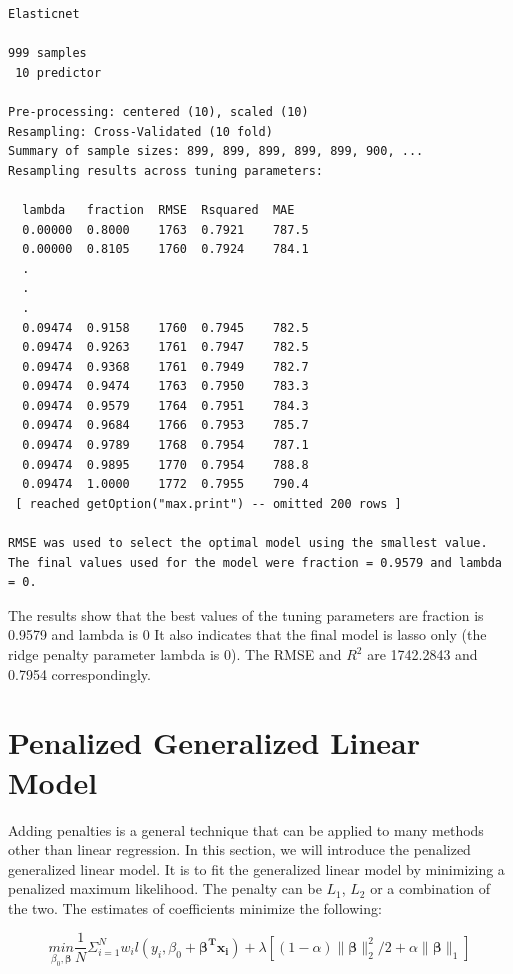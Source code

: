 \documentclass[12pt,]{krantz}
\begin{document}
\begin{verbatim}
Elasticnet 

999 samples
 10 predictor

Pre-processing: centered (10), scaled (10) 
Resampling: Cross-Validated (10 fold) 
Summary of sample sizes: 899, 899, 899, 899, 899, 900, ... 
Resampling results across tuning parameters:

  lambda   fraction  RMSE  Rsquared  MAE  
  0.00000  0.8000    1763  0.7921    787.5
  0.00000  0.8105    1760  0.7924    784.1
  .
  .
  .
  0.09474  0.9158    1760  0.7945    782.5
  0.09474  0.9263    1761  0.7947    782.5
  0.09474  0.9368    1761  0.7949    782.7
  0.09474  0.9474    1763  0.7950    783.3
  0.09474  0.9579    1764  0.7951    784.3
  0.09474  0.9684    1766  0.7953    785.7
  0.09474  0.9789    1768  0.7954    787.1
  0.09474  0.9895    1770  0.7954    788.8
  0.09474  1.0000    1772  0.7955    790.4
 [ reached getOption("max.print") -- omitted 200 rows ]

RMSE was used to select the optimal model using the smallest value.
The final values used for the model were fraction = 0.9579 and lambda = 0.
\end{verbatim}

The results show that the best values of the tuning parameters are fraction is 0.9579 and lambda is 0 It also indicates that the final model is lasso only (the ridge penalty parameter lambda is 0). The RMSE and \(R^{2}\) are 1742.2843 and 0.7954 correspondingly.

\hypertarget{penalized-generalized-linear-model}{%
\section{Penalized Generalized Linear Model}\label{penalized-generalized-linear-model}}

Adding penalties is a general technique that can be applied to many methods other than linear regression. In this section, we will introduce the penalized generalized linear model. It is to fit the generalized linear model by minimizing a penalized maximum likelihood. The penalty can be \(L_1\), \(L_2\) or a combination of the two. The estimates of coefficients minimize the following:

\[\underset{\beta_{0},\mathbf{\beta}}{min}\frac{1}{N}\Sigma_{i=1}^{N}w_{i}l(y_{i},\beta_{0}+\mathbf{\beta^{T}x_{i}})+\lambda[(1-\alpha)\parallel\mathbf{\beta}\parallel_{2}^{2}/2+\alpha\parallel\mathbf{\beta}\parallel_{1}]\]
\end{document}
